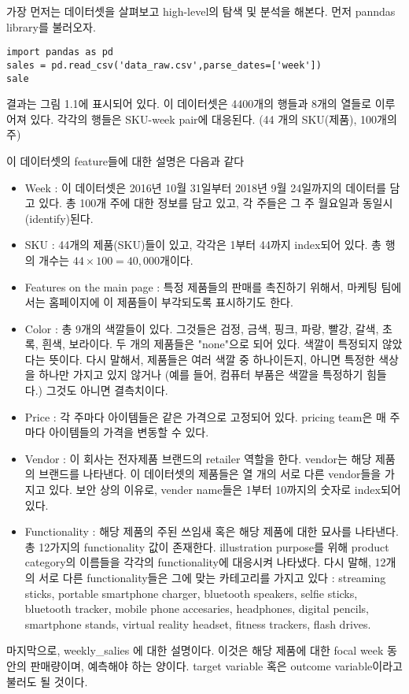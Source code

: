 \documentclass{report}
\begin{document}
가장 먼저는 데이터셋을 살펴보고 high-level의 탐색 및 분석을 해본다.
먼저 panndas library를 불러오자.

\begin{lstlisting}
import pandas as pd
sales = pd.read_csv('data_raw.csv',parse_dates=['week'])
sale
\end{lstlisting}

결과는 그림 1.1에 표시되어 있다.
이 데이터셋은 4400개의 행들과 8개의 열들로 이루어져 있다.
각각의 행들은 SKU-week pair에 대응된다.
(44 개의 SKU(제품), 100개의 주)

이 데이터셋의 feature들에 대한 설명은 다음과 같다
\begin{itemize}
\item
Week : 이 데이터셋은 2016년 10월 31일부터 2018년 9월 24일까지의 데이터를 담고 있다.
총 100개 주에 대한 정보를 담고 있고, 각 주들은 그 주 월요일과 동일시(identify)된다.
\item
SKU : 44개의 제품(SKU)들이 있고, 각각은 1부터 44까지 index되어 있다.
총 행의 개수는 \(44\times100=40,000\)개이다.
\item
Features on the main page : 특정 제품들의 판매를 촉진하기 위해서, 마케팅 팀에서는 홈페이지에 이 제품들이 부각되도록 표시하기도 한다.
\item
Color : 총 9개의 색깔들이 있다.
그것들은 검정, 금색, 핑크, 파랑, 빨강, 갈색, 초록, 흰색, 보라이다.
두 개의 제품들은 "none"으로 되어 있다.
색깔이 특정되지 않았다는 뜻이다.
다시 말해서, 제품들은 여러 색깔 중 하나이든지, 아니면 특정한 색상을 하나만 가지고 있지 않거나 (예를 들어, 컴퓨터 부품은 색깔을 특정하기 힘들다.) 그것도 아니면 결측치이다.
\item
Price : 각 주마다 아이템들은 같은 가격으로 고정되어 있다.
pricing team은 매 주마다 아이템들의 가격을 변동할 수 있다.
\item
Vendor : 이 회사는 전자제품 브랜드의 retailer 역할을 한다.
vendor는 해당 제품의 브랜드를 나타낸다.
이 데이터셋의 제품들은 열 개의 서로 다른 vendor들을 가지고 있다.
보안 상의 이유로, vender name들은 1부터 10까지의 숫자로 index되어 있다.
\item
Functionality : 해당 제품의 주된 쓰임새 혹은 해당 제품에 대한 묘사를 나타낸다.
총 12가지의 functionality 값이 존재한다.
illustration purpose를 위해 product category의 이름들을 각각의 functionality에 대응시켜 나타냈다.
다시 말해, 12개의 서로 다른 functionality들은 그에 맞는 카테고리를 가지고 있다 : streaming sticks, portable smartphone charger, bluetooth speakers, selfie sticks, bluetooth tracker, mobile phone accesaries, headphones, digital pencils, smartphone stands, virtual reality headset, fitness trackers, flash drives.
\end{itemize}

마지막으로, weekly\_salies 에 대한 설명이다.
이것은 해당 제품에 대한 focal week 동안의 판매량이며, 예측해야 하는 양이다.
target variable 혹은 outcome variable이라고 불러도 될 것이다.
\end{document}
